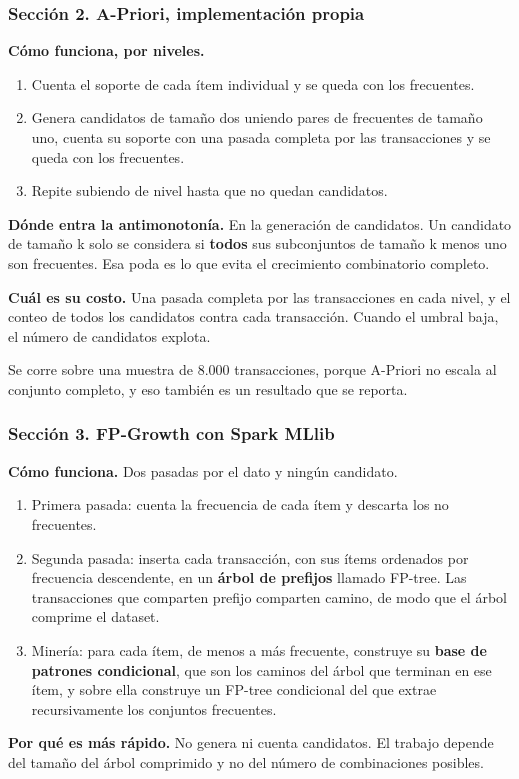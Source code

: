 \documentclass[11pt]{article}
\begin{document}
\subsubsection*{Sección 2. A-Priori, implementación propia}
\textbf{Cómo funciona, por niveles.}

\begin{enumerate}
  \item Cuenta el soporte de cada ítem individual y se queda con los frecuentes.
  \item Genera candidatos de tamaño dos uniendo pares de frecuentes de tamaño uno, cuenta su soporte con una pasada completa por las transacciones y se queda con los frecuentes.
  \item Repite subiendo de nivel hasta que no quedan candidatos.
\end{enumerate}
\textbf{Dónde entra la antimonotonía.} En la generación de candidatos. Un candidato de tamaño k solo se considera si \textbf{todos} sus subconjuntos de tamaño k menos uno son frecuentes. Esa poda es lo que evita el crecimiento combinatorio completo.

\textbf{Cuál es su costo.} Una pasada completa por las transacciones en cada nivel, y el conteo de todos los candidatos contra cada transacción. Cuando el umbral baja, el número de candidatos explota.

Se corre sobre una muestra de 8.000 transacciones, porque A-Priori no escala al conjunto completo, y eso también es un resultado que se reporta.

\subsubsection*{Sección 3. FP-Growth con Spark MLlib}
\textbf{Cómo funciona.} Dos pasadas por el dato y ningún candidato.

\begin{enumerate}
  \item Primera pasada: cuenta la frecuencia de cada ítem y descarta los no frecuentes.
  \item Segunda pasada: inserta cada transacción, con sus ítems ordenados por frecuencia descendente, en un \textbf{árbol de prefijos} llamado FP-tree. Las transacciones que comparten prefijo comparten camino, de modo que el árbol comprime el dataset.
  \item Minería: para cada ítem, de menos a más frecuente, construye su \textbf{base de patrones condicional}, que son los caminos del árbol que terminan en ese ítem, y sobre ella construye un FP-tree condicional del que extrae recursivamente los conjuntos frecuentes.
\end{enumerate}
\textbf{Por qué es más rápido.} No genera ni cuenta candidatos. El trabajo depende del tamaño del árbol comprimido y no del número de combinaciones posibles.
\end{document}
